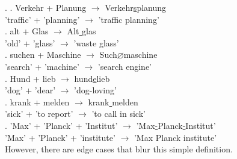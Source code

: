 \documentclass[11pt]{article}
\begin{document}
\ex.
\ag. \label{ex4:1}Verkehr + Planung {$\rightarrow$} Verkehr\underline{s}planung \\
'traffic' + 'planning' {$\rightarrow$} {'traffic planning'} \\
\bg. \label{ex4:2}alt + Glas {$\rightarrow$} Alt\underline{ }glas \\
'old' + 'glass' {$\rightarrow$} {'waste glass'} \\
\cg. \label{ex4:3}suchen + Maschine {$\rightarrow$} Such\underline{$\varnothing$}maschine \\
'search' + 'machine' {$\rightarrow$} {'search engine'} \\
\dg. \label{ex4:4}Hund + lieb {$\rightarrow$} hund\underline{e}lieb \\
'dog' + 'dear' {$\rightarrow$} 'dog-loving' \\
\eg. \label{ex4:5}krank + melden {$\rightarrow$} krank\underline{ }melden \\
'sick' + {'to report'} {$\rightarrow$} {'to call in sick'} \\
\fg. \label{ex4:6}'Max' + 'Planck' + 'Institut' {$\rightarrow$} {'Max\underline{-}Planck\underline{-}Institut'} \\
'Max' + 'Planck' + 'institute' {$\rightarrow$} {'Max Planck institute'} \\


However, there are edge cases that blur this simple definition.
\end{document}
